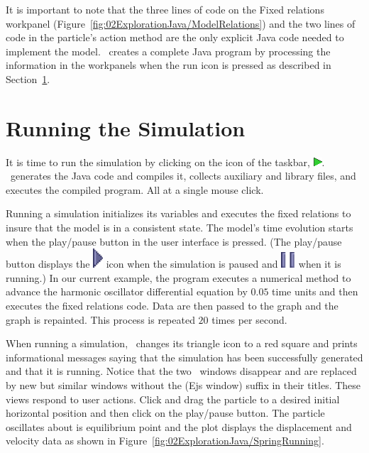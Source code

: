 It is important to note that the three lines of  code on the Fixed relations workpanel (Figure~\ref{fig:02ExplorationJava/ModelRelations}) and the two lines of code in the particle's action method are the only explicit Java code needed to implement the model.  \Ejs\ creates a complete Java program by processing the information in the workpanels when the run icon is pressed as described in Section~\ref{section:02ExplorationJavaRunning}.

\section{Running the Simulation}\label{section:02ExplorationJavaRunning}

It is time to run the simulation by clicking on the  icon of the taskbar, \includegraphics[scale=\linescale]{../_common/icons_png/launch.png}.  \ejs\ generates the Java code and compiles it, collects auxiliary and library files, and executes the compiled program. All at a single mouse click.

Running a simulation initializes its variables and executes the fixed relations to insure that the model is in a consistent state.  The model's time evolution starts when the play/pause button in the user interface is pressed. (The play/pause button displays the \includegraphics[scale=\linescale]{../_common/icons_png/play.png} icon when the simulation is paused and \includegraphics[scale=\linescale]{../_common/icons_png/pause.png} when it is running.) In our current example, the program executes a numerical method to advance the harmonic oscillator differential equation by $0.05$ time units and then executes the fixed relations code.  Data are then passed to the graph and the graph is repainted. This process is repeated $20$ times per second.

When running a simulation, \ejs\ changes its  triangle icon to a red  square and prints informational messages saying that the
simulation has been successfully generated and that it is running. Notice that the two \ejs\ windows disappear and are
replaced by new but similar windows without the \code(Ejs window) suffix in their titles.  These views respond to user
actions. Click and drag the particle to a desired initial horizontal position and then click on the play/pause button.
The particle oscillates about is equilibrium point and the plot displays the displacement and velocity data as shown in
Figure~\ref{fig:02ExplorationJava/SpringRunning}.

